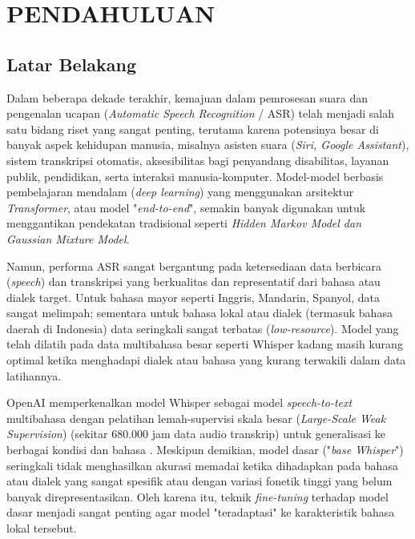 \newpage
\chapter{PENDAHULUAN} \label{Bab I}

\section{Latar Belakang} \label{I.Latar Belakang}
Dalam beberapa dekade terakhir, kemajuan dalam pemrosesan suara dan pengenalan ucapan (\textit{Automatic Speech Recognition} / ASR) telah menjadi salah satu bidang riset yang sangat penting, terutama karena potensinya besar di banyak aspek kehidupan manusia, misalnya asisten suara (\textit{Siri, Google Assistant}), sistem transkripsi otomatis, aksesibilitas bagi penyandang disabilitas, layanan publik, pendidikan, serta interaksi manusia-komputer. Model-model berbasis pembelajaran mendalam (\textit{deep learning}) yang menggunakan arsitektur \textit{Transformer}, atau model "\textit{end-to-end}", semakin banyak digunakan untuk menggantikan pendekatan tradisional seperti \textit{Hidden Markov Model dan Gaussian Mixture Model}. \par

Namun, performa ASR sangat bergantung pada ketersediaan data berbicara (\textit{speech}) dan transkripsi yang berkualitas dan representatif dari bahasa atau dialek target. Untuk bahasa mayor seperti Inggris, Mandarin, Spanyol, data sangat melimpah; sementara untuk bahasa lokal atau dialek (termasuk bahasa daerah di Indonesia) data seringkali sangat terbatas (\textit{low-resource}). Model yang telah dilatih pada data multibahasa besar seperti Whisper kadang masih kurang optimal ketika menghadapi dialek atau bahasa yang kurang terwakili dalam data latihannya. \par

OpenAI memperkenalkan model Whisper sebagai model \textit{speech-to-text} multibahasa dengan pelatihan lemah-supervisi skala besar (\textit{Large-Scale Weak Supervision}) (sekitar 680.000 jam data audio transkrip) untuk generalisasi ke berbagai kondisi dan bahasa \cite{radford2023whisper}. Meskipun demikian, model dasar ("\textit{base Whisper}") seringkali tidak menghasilkan akurasi memadai ketika dihadapkan pada bahasa atau dialek yang sangat spesifik atau dengan variasi fonetik tinggi yang belum banyak direpresentasikan. Oleh karena itu, teknik \textit{fine-tuning} terhadap model dasar menjadi sangat penting agar model "teradaptasi" ke karakteristik bahasa lokal tersebut. \par

